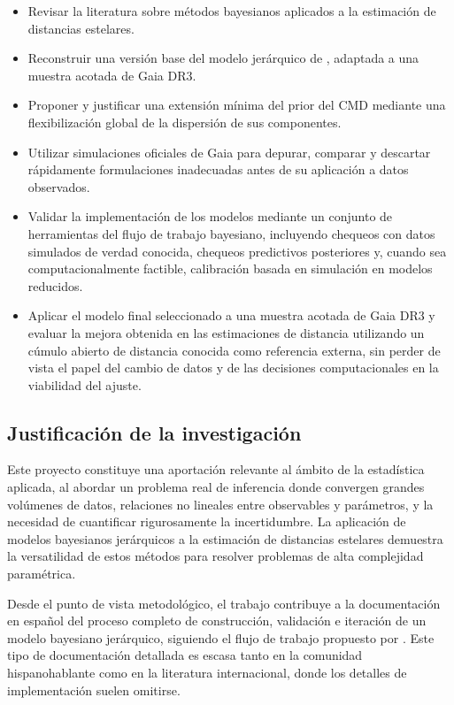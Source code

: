 \documentclass[stu, 12pt, letterpaper, donotrepeattitle, floatsintext, natbib]{apa7_ula}
\begin{document}
\begin{itemize}
    \item Revisar la literatura sobre métodos bayesianos aplicados
    a la estimación de distancias estelares.
    \item Reconstruir una versión base del modelo jerárquico de
    \citet{Leistedt_2017}, adaptada a una muestra acotada de Gaia DR3.
    \item Proponer y justificar una extensión mínima del prior del CMD
    mediante una flexibilización global de la dispersión de sus
    componentes.
    \item Utilizar simulaciones oficiales de Gaia para depurar,
    comparar y descartar rápidamente formulaciones inadecuadas antes
    de su aplicación a datos observados.
    \item Validar la implementación de los modelos mediante un
    conjunto de herramientas del flujo de trabajo bayesiano,
    incluyendo chequeos con datos simulados de verdad conocida,
    chequeos predictivos posteriores y, cuando sea computacionalmente
    factible, calibración basada en simulación en modelos reducidos.
    \item Aplicar el modelo final seleccionado a una muestra acotada
    de Gaia DR3 y evaluar la mejora obtenida en las estimaciones de
    distancia utilizando un cúmulo abierto de distancia conocida como
    referencia externa, sin perder de vista el papel del cambio de
    datos y de las decisiones computacionales en la viabilidad del
    ajuste.
\end{itemize}

\subsection{Justificación de la investigación}

Este proyecto constituye una aportación relevante al ámbito de la
estadística aplicada, al abordar un problema real de inferencia donde
convergen grandes volúmenes de datos, relaciones no lineales entre
observables y parámetros, y la necesidad de cuantificar rigurosamente
la incertidumbre. La aplicación de modelos bayesianos jerárquicos a la
estimación de distancias estelares demuestra la versatilidad de estos
métodos para resolver problemas de alta complejidad paramétrica.

Desde el punto de vista metodológico, el trabajo contribuye a la
documentación en español del proceso completo de construcción,
validación e iteración de un modelo bayesiano jerárquico, siguiendo
el flujo de trabajo propuesto por \citet{gelman2020bayesian}. Este
tipo de documentación detallada es escasa tanto en la comunidad
hispanohablante como en la literatura internacional, donde los
detalles de implementación suelen omitirse.
\end{document}
